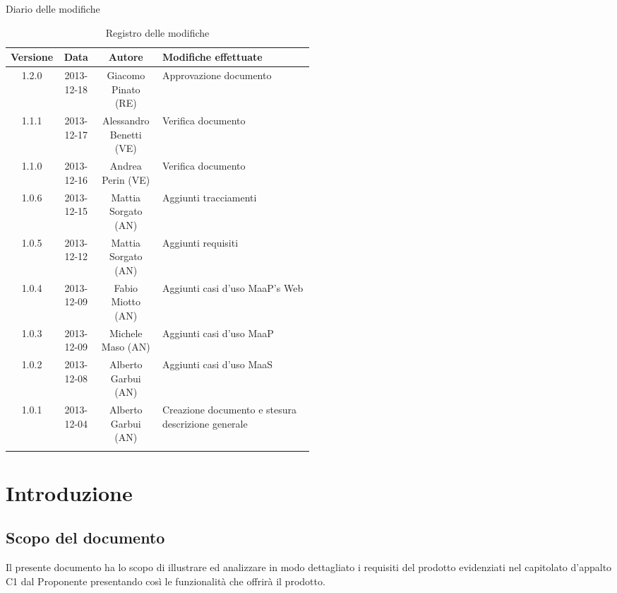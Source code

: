 
\newpage
Diario delle modifiche
\begin{center}
\begin{longtable}{|c|c|c|p{0.5\linewidth}|}
\toprule
\textbf{Versione} & \textbf{Data} & \textbf{Autore} & \textbf{Modifiche effettuate}\\


\midrule
1.2.0 & 2013-12-18 & Giacomo Pinato (RE) & Approvazione documento\\
\midrule
1.1.1 & 2013-12-17 & Alessandro Benetti (VE) & Verifica documento\\
\midrule
1.1.0 & 2013-12-16 & Andrea Perin (VE) & Verifica documento\\
\midrule
1.0.6 & 2013-12-15 & Mattia Sorgato (AN) & Aggiunti tracciamenti\\
\midrule
1.0.5 & 2013-12-12 & Mattia Sorgato (AN) & Aggiunti requisiti\\
\midrule
1.0.4 & 2013-12-09 & Fabio Miotto (AN) & Aggiunti casi d'uso MaaP's Web\\
\midrule
1.0.3 & 2013-12-09 & Michele Maso (AN) & Aggiunti casi d'uso MaaP\\
\midrule
1.0.2 & 2013-12-08 & Alberto Garbui (AN) & Aggiunti casi d'uso MaaS\\
\midrule
1.0.1 & 2013-12-04 & Alberto Garbui (AN) & Creazione documento e stesura descrizione generale\\

\bottomrule
\caption{Registro delle modifiche}
\label{tab:changelog}
\end{longtable}
\end{center}

\newpage
\tableofcontents

\newpage
\listoftables
\listoffigures

\newpage
\section{Introduzione}%
\label{1.0}
\subsection{Scopo del documento}%
\label{1.1}
Il presente documento ha lo scopo di illustrare ed analizzare in modo dettagliato i requisiti del prodotto  evidenziati nel capitolato d'appalto C1 dal Proponente \Prop{} presentando così le funzionalità che offrirà il prodotto.

